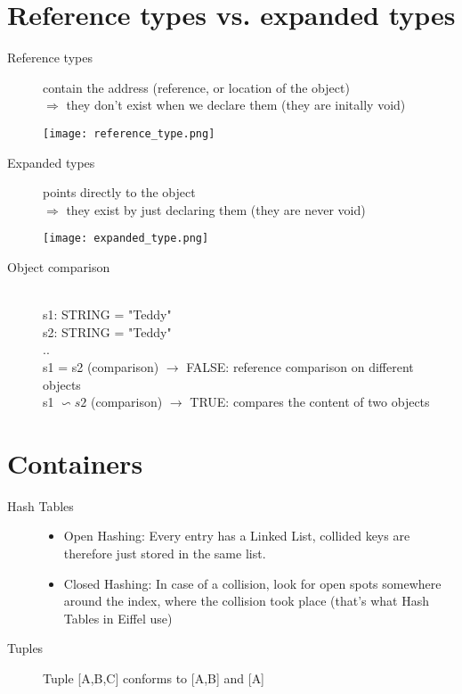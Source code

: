 \documentclass[11pt]{article}
\begin{document}
\section{Reference types vs. expanded types}
\begin{description}
	\item[Reference types]
	contain the address (reference, or location of the object) \\
	$\Rightarrow$ they don't exist when we declare them (they are initally void)
	\begin{center}
	\texttt{[image: reference\_type.png]}
	\end{center}
	
	\item[Expanded types]
	points directly to the object \\
	$\Rightarrow$ they exist by just declaring them (they are never void) \\
	\begin{center}
	\texttt{[image: expanded\_type.png]}
	\end{center}
	
	\item[Object comparison] \mbox{} \\
	s1: STRING = "Teddy" \\
	s2: STRING = "Teddy" \\
	.. \\
	s1 = s2 (comparison) $\rightarrow$ FALSE: reference comparison on different objects\\
	s1 $\backsim s2$ (comparison) $\rightarrow$ TRUE: compares the content of two objects\\
	
\end{description}


\section{Containers}

\begin{description}
	\item[Hash Tables]
	\begin{itemize}
		\item Open Hashing: Every entry has a Linked List, collided keys are therefore just stored in the same list.
		\item Closed Hashing: In case of a collision, look for open spots somewhere around the index, where the collision took place (that's what Hash Tables in Eiffel use)
	\end{itemize}
 	\item[Tuples] Tuple [A,B,C] conforms to [A,B] and [A]
\end{description}
\end{document}

